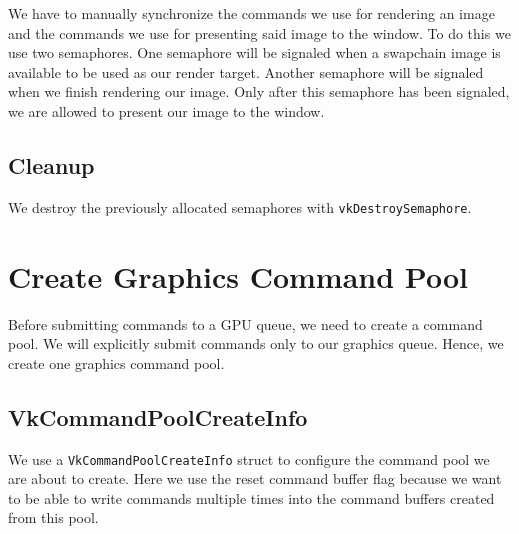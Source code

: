 We have to manually synchronize the commands we use for rendering an image
and the commands we use for presenting said image to the window.
To do this we use two semaphores.
One semaphore will be signaled when a swapchain image is available to
be used as our render target.
Another semaphore will be signaled when we finish rendering our image.
Only after this semaphore has been signaled, we are allowed to present our
image to the window.

\begin{minipage}{\linewidth}{\noindent}
    
\end{minipage}

\subsection{Cleanup}

We destroy the previously allocated semaphores with \texttt{vkDestroySemaphore}.

\section{Create Graphics Command Pool}

Before submitting commands to a GPU queue, we need to create a command pool.
We will explicitly submit commands only to our graphics queue.
Hence, we create one graphics command pool.

\begin{minipage}{\linewidth}{\noindent}
    
\end{minipage}

\subsection{VkCommandPoolCreateInfo}

We use a \texttt{VkCommandPoolCreateInfo} struct to configure the command pool we are
about to create.
Here we use the reset command buffer flag because we want to be able to
write commands multiple times into the command buffers created from this pool.

\begin{minipage}{\linewidth}{\noindent}
    
\end{minipage}

